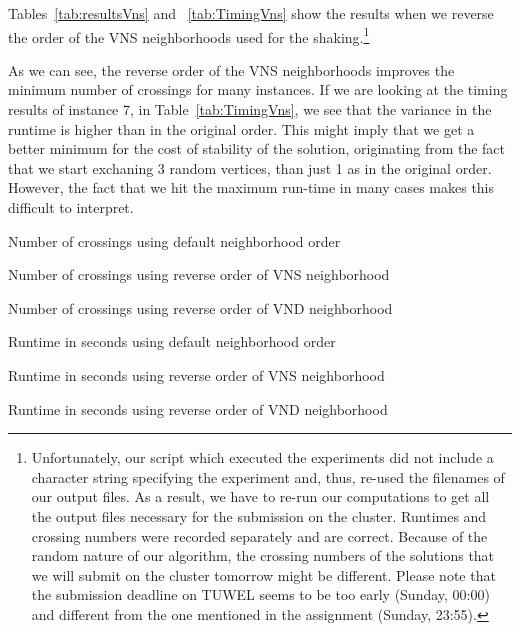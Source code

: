 \documentclass{scrartcl}
\begin{document}
Tables~\ref{tab:resultsVns} and ~\ref{tab:TimingVns} show the
results when we reverse the order of the VNS neighborhoods
used for the shaking.\footnote{Unfortunately, our script which executed
  the experiments did not include a character string specifying the
  experiment and, thus, re-used the filenames of our output files. As a result,
  we have to re-run our computations to get all the output files
  necessary for the submission on the cluster. Runtimes and crossing
  numbers were recorded separately and are correct. Because of the
  random nature of our algorithm, the crossing numbers of the solutions that we will
  submit on the cluster tomorrow might be different. Please note that
  the submission deadline on TUWEL seems to be too early (Sunday,
  00:00) and different from the one mentioned in the assignment
  (Sunday, 23:55).}

As we can see, the reverse order of the VNS neighborhoods improves the
minimum number of crossings for many instances. If we are looking at
the timing results of instance 7, in Table~\ref{tab:TimingVns}, we see
that the variance in the runtime is higher than in the original order.
This might imply that we get a better minimum for the cost of
stability of the solution, originating from the fact that we start
exchaning 3 random vertices, than just 1 as in the original order. However,
the fact that we hit the maximum run-time in many cases makes this difficult to interpret.


\begin{table}[!H]
  \centering
  \scriptsize
  
\caption{Number of crossings using default neighborhood order}
\label{tab:resultsOverall}
\end{table}

\begin{table}[!H]
  \centering
  \scriptsize
  
\caption{Number of crossings using reverse order of VNS neighborhood}
\label{tab:resultsVns}
\end{table}

\begin{table}[!H]
  \centering
  \scriptsize
  
\caption{Number of crossings using reverse order of VND neighborhood}
\label{tab:resultsVnd}
\end{table}

\clearpage

\begin{table}[H]
  \centering
  \scriptsize
  
\caption{Runtime in seconds using default neighborhood order}
\label{tab:Timing}
\end{table}

\begin{table}[H]
  \centering
  \scriptsize
  
\caption{Runtime in seconds using reverse order of VNS neighborhood}
\label{tab:TimingVns}
\end{table}

\begin{table}[H]
  \centering
  \scriptsize
  
\caption{Runtime in seconds using reverse order of VND neighborhood}
\label{tab:TimingVnd}
\end{table}
\end{document}
